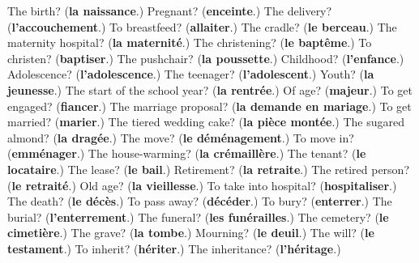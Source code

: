 \begin{tcolorbox}[breakable,colback=teal!4,colframe=teal!35!black,title={Before you move on}]
The birth? (\textbf{la naissance}.) Pregnant? (\textbf{enceinte}.) The delivery? (\textbf{l'accouchement}.) To breastfeed? (\textbf{allaiter}.) The cradle? (\textbf{le berceau}.) The maternity hospital? (\textbf{la maternité}.) The christening? (\textbf{le baptême}.) To christen? (\textbf{baptiser}.) The pushchair? (\textbf{la poussette}.) Childhood? (\textbf{l'enfance}.) Adolescence? (\textbf{l'adolescence}.) The teenager? (\textbf{l'adolescent}.) Youth? (\textbf{la jeunesse}.) The start of the school year? (\textbf{la rentrée}.) Of age? (\textbf{majeur}.) To get engaged? (\textbf{fiancer}.) The marriage proposal? (\textbf{la demande en mariage}.) To get married? (\textbf{marier}.) The tiered wedding cake? (\textbf{la pièce montée}.) The sugared almond? (\textbf{la dragée}.) The move? (\textbf{le déménagement}.) To move in? (\textbf{emménager}.) The house-warming? (\textbf{la crémaillère}.) The tenant? (\textbf{le locataire}.) The lease? (\textbf{le bail}.) Retirement? (\textbf{la retraite}.) The retired person? (\textbf{le retraité}.) Old age? (\textbf{la vieillesse}.) To take into hospital? (\textbf{hospitaliser}.) The death? (\textbf{le décès}.) To pass away? (\textbf{décéder}.) To bury? (\textbf{enterrer}.) The burial? (\textbf{l'enterrement}.) The funeral? (\textbf{les funérailles}.) The cemetery? (\textbf{le cimetière}.) The grave? (\textbf{la tombe}.) Mourning? (\textbf{le deuil}.) The will? (\textbf{le testament}.) To inherit? (\textbf{hériter}.) The inheritance? (\textbf{l'héritage}.)
\end{tcolorbox}
